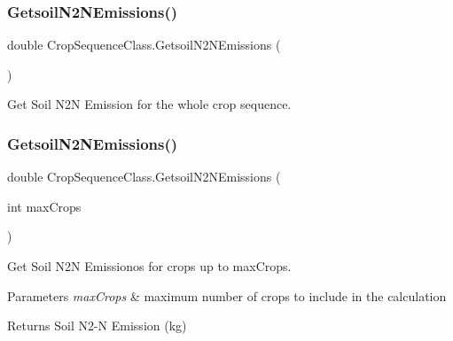 \subsubsection{\texorpdfstring{GetsoilN2NEmissions()}{GetsoilN2NEmissions()}\hspace{0.1cm}{\footnotesize\ttfamily [1/2]}}
{\footnotesize\ttfamily double Crop\+Sequence\+Class.\+Getsoil\+N2\+N\+Emissions (\begin{DoxyParamCaption}{ }\end{DoxyParamCaption})\hspace{0.3cm}{\ttfamily [inline]}}



Get Soil N2N Emission for the whole crop sequence. 

\mbox{\label{class_crop_sequence_class_aad5858d480c48cb5675a96d8a5e95e80}} 
\subsubsection{\texorpdfstring{GetsoilN2NEmissions()}{GetsoilN2NEmissions()}\hspace{0.1cm}{\footnotesize\ttfamily [2/2]}}
{\footnotesize\ttfamily double Crop\+Sequence\+Class.\+Getsoil\+N2\+N\+Emissions (\begin{DoxyParamCaption}\item[{int}]{max\+Crops }\end{DoxyParamCaption})\hspace{0.3cm}{\ttfamily [inline]}}



Get Soil N2N Emissionos for crops up to max\+Crops. 


\begin{DoxyParams}{Parameters}
{\em max\+Crops} & maximum number of crops to include in the calculation \\
\hline
\end{DoxyParams}
\begin{DoxyReturn}{Returns}
Soil N2-\/N Emission (kg) 
\end{DoxyReturn}
\mbox{\label{class_crop_sequence_class_a25fe9085ff4966e87375b1cee8b959e0}} 
